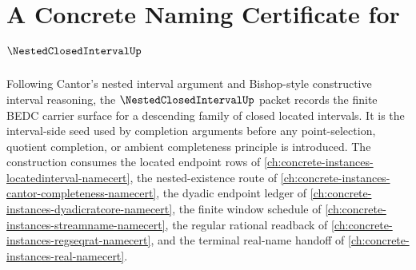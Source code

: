 \chapter{A Concrete Naming Certificate for $\NestedClosedIntervalUp$}
\label{ch:concrete-instances-nested-closed-interval-namecert}

Following Cantor's nested interval argument and Bishop-style constructive interval reasoning, the $\NestedClosedIntervalUp$ packet records the finite BEDC carrier surface for a descending family of closed located intervals. It is the interval-side seed used by completion arguments before any point-selection, quotient completion, or ambient completeness principle is introduced. The construction consumes the located endpoint rows of \autoref{ch:concrete-instances-locatedinterval-namecert}, the nested-existence route of \autoref{ch:concrete-instances-cantor-completeness-namecert}, the dyadic endpoint ledger of \autoref{ch:concrete-instances-dyadicratcore-namecert}, the finite window schedule of \autoref{ch:concrete-instances-streamname-namecert}, the regular rational readback of \autoref{ch:concrete-instances-regseqrat-namecert}, and the terminal real-name handoff of \autoref{ch:concrete-instances-real-namecert}.

